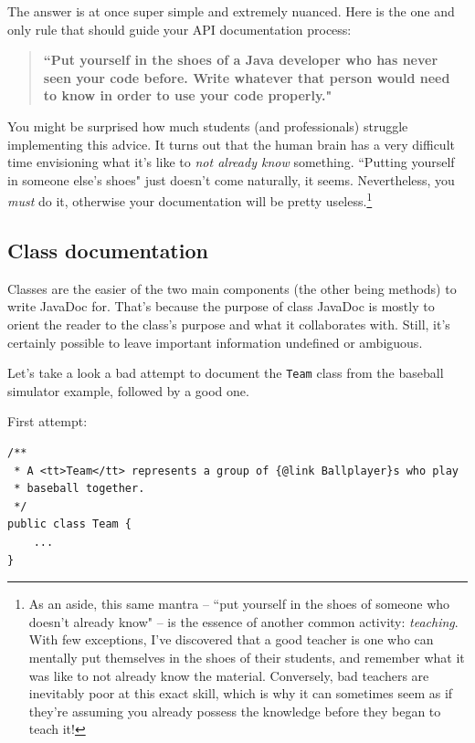 The answer is at once super simple and extremely nuanced. Here is the one and
only rule that should guide your API documentation process:

\begin{samepage}
\begin{quote}

\textbf{\textsf{``Put yourself in the shoes of a Java developer who has never
seen your code before. Write whatever that person would need to know in order
to use your code properly."}}

\end{quote}
\end{samepage}

You might be surprised how much students (and professionals) struggle
implementing this advice. It turns out that the human brain has a very
difficult time envisioning what it's like to \textit{not already know}
something. ``Putting yourself in someone else's shoes" just doesn't come
naturally, it seems. Nevertheless, you \textit{must} do it, otherwise your
documentation will be pretty useless.\footnote{As an aside, this same mantra
-- ``put yourself in the shoes of someone who doesn't already know" -- is the
essence of another common activity: \textit{teaching}. With few exceptions,
I've discovered that a good teacher is one who can mentally put themselves in
the shoes of their students, and remember what it was like to not already know
the material. Conversely, bad teachers are inevitably poor at this exact
skill, which is why it can sometimes seem as if they're assuming you already
possess the knowledge before they began to teach it!}


\subsection{Class documentation}

Classes are the easier of the two main components (the other being methods) to
write JavaDoc for. That's because the purpose of class JavaDoc is mostly to
orient the reader to the class's purpose and what it collaborates with. Still,
it's certainly possible to leave important information undefined or ambiguous.

Let's take a look a bad attempt to document the \texttt{Team} class from the
baseball simulator example, followed by a good one.

First attempt:
\vspace{-.15in}
\begin{Verbatim}[fontsize=\small,samepage=true,frame=single]
/**
 * A <tt>Team</tt> represents a group of {@link Ballplayer}s who play
 * baseball together.
 */
public class Team {
    ...
}
\end{Verbatim}

